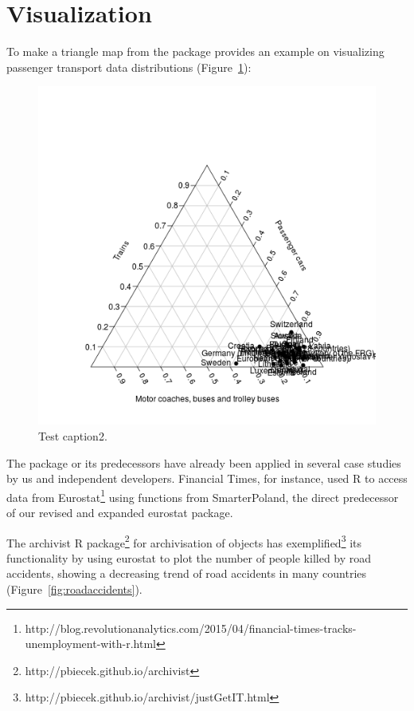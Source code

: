 \section{Visualization}

To make a triangle map from the  \citep{plotrix}
package provides an example on visualizing passenger transport data
distributions (Figure~\ref{fig:plotrix}):

\begin{figure}
\begin{center}
\includegraphics{2015-manu-search2-1}
\end{center}
\caption{Test caption2.}
\label{fig:plotrix}
\end{figure}

The package or its predecessors have already been applied in several case studies by us and independent developers. Financial Times, for instance, used R to access data from Eurostat\footnote{http://blog.revolutionanalytics.com/2015/04/financial-times-tracks-unemployment-with-r.html} using functions from SmarterPoland, the direct predecessor of our revised and expanded eurostat package.

The archivist R package\footnote{http://pbiecek.github.io/archivist} for archivisation of objects has exemplified\footnote{http://pbiecek.github.io/archivist/justGetIT.html} its functionality by using eurostat to plot the number of people killed by road accidents, showing a decreasing trend of road accidents in many countries (Figure~\ref{fig:roadaccidents}).

